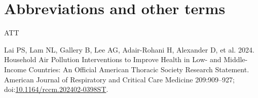 \documentclass[
  letterpaper,
  DIV=11,
  numbers=noendperiod]{scrartcl}
\newlength{\cslhangindent}
\newenvironment{CSLReferences}[2] %
 {\begin{list}{}{%
  \setlength{\itemindent}{0pt}
  \setlength{\leftmargin}{0pt}
  \setlength{\parsep}{0pt}
  \ifodd #1
   \setlength{\leftmargin}{\cslhangindent}
   \setlength{\itemindent}{-1\cslhangindent}
  \fi
  \setlength{\itemsep}{#2\baselineskip}}}
 {\end{list}}
\begin{document}
\newpage

\section*{Abbreviations and other
terms}\label{abbreviations-and-other-terms}

ATT

\label{refs}
\begin{CSLReferences}{1}{1}
Lai PS, Lam NL, Gallery B, Lee AG, Adair-Rohani H, Alexander D, et al.
2024. Household {Air Pollution Interventions} to {Improve Health} in
{Low-} and {Middle-Income Countries}: {An Official American Thoracic
Society Research Statement}. American Journal of Respiratory and
Critical Care Medicine 209:909--927;
doi:\href{https://doi.org/10.1164/rccm.202402-0398ST}{10.1164/rccm.202402-0398ST}.

\end{CSLReferences}
\end{document}
